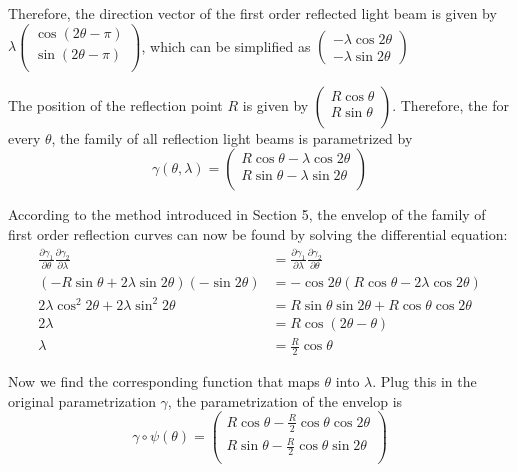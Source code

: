 \documentclass[a4paper]{article}
\begin{document}
Therefore, the direction vector of the first order reflected light beam is given by $\lambda
\begin{pmatrix}
\cos (2\theta - \pi)\\
\sin (2\theta - \pi)\\
\end{pmatrix}$, which can be simplified as $\begin{pmatrix}
-\lambda \cos 2\theta\\
-\lambda \sin 2\theta
\end{pmatrix}$

The position of the reflection point $R$ is given by $\begin{pmatrix}
R \cos \theta\\
R \sin \theta\\
\end{pmatrix}$. Therefore, the for every $\theta$, the family of all reflection light beams is parametrized by
$$\gamma(\theta,\lambda) =
\begin{pmatrix}
R \cos \theta - \lambda \cos 2\theta\\
R \sin \theta - \lambda \sin 2\theta\\
\end{pmatrix}$$

According to the method introduced in Section 5, the envelop of the family of first order reflection curves can now be found by solving the differential equation:
\begin{align*}
\frac{\partial \gamma_1}{\partial \theta}\frac{\partial \gamma_2}{\partial \lambda} &= \frac{\partial \gamma_1}{\partial \lambda}\frac{\partial \gamma_2}{\partial \theta}\\
(-R\sin \theta + 2\lambda \sin 2\theta)(-\sin 2\theta) &= -\cos 2\theta (R\cos \theta - 2\lambda \cos 2\theta)\\
2\lambda \cos^2 2\theta + 2\lambda \sin^2 2\theta &= R \sin \theta \sin 2\theta + R \cos \theta \cos 2\theta\\
2\lambda &= R \cos (2\theta - \theta)\\
\lambda &= \frac{R}{2}\cos \theta
\end{align*}

Now we find the corresponding function that maps $\theta$ into $\lambda$. Plug this in the original parametrization $\gamma$, the parametrization of the envelop is
$$\gamma \circ \psi(\theta) =
\begin{pmatrix}
R\cos \theta - \frac{R}{2}\cos \theta \cos 2\theta\\
R\sin \theta - \frac{R}{2}\cos \theta \sin 2\theta\\
\end{pmatrix}$$
\end{document}
